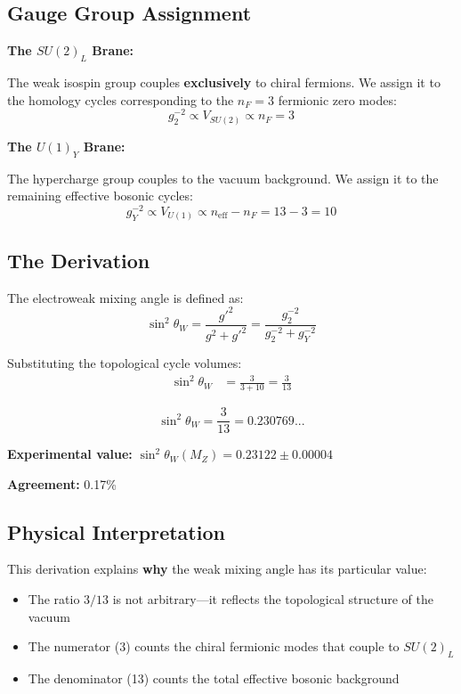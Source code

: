 \documentclass[12pt,a4paper]{article}
\newcommand{\sinW}{\sin^2\theta_W}
\newcommand{\nF}{n_F}
\begin{document}
\subsection{Gauge Group Assignment}

\textbf{The $SU(2)_L$ Brane:}

The weak isospin group couples \textbf{exclusively} to chiral fermions. We assign it to the homology cycles corresponding to the $\nF = 3$ fermionic zero modes:
\begin{equation}
g_2^{-2} \propto V_{SU(2)} \propto \nF = 3
\end{equation}

\textbf{The $U(1)_Y$ Brane:}

The hypercharge group couples to the vacuum background. We assign it to the remaining effective bosonic cycles:
\begin{equation}
g_Y^{-2} \propto V_{U(1)} \propto n_{\text{eff}} - \nF = 13 - 3 = 10
\end{equation}

\subsection{The Derivation}

The electroweak mixing angle is defined as:
\begin{equation}
\sinW = \frac{g'^2}{g^2 + g'^2} = \frac{g_2^{-2}}{g_2^{-2} + g_Y^{-2}}
\end{equation}

Substituting the topological cycle volumes:
\begin{align}
\sinW &= \frac{3}{3 + 10} = \frac{3}{13}
\end{align}

\begin{equation}
\boxed{\sinW = \frac{3}{13} = 0.230769...}
\end{equation}

\textbf{Experimental value:} $\sinW(M_Z) = 0.23122 \pm 0.00004$

\textbf{Agreement:} 0.17\%

\subsection{Physical Interpretation}

This derivation explains \textbf{why} the weak mixing angle has its particular value:
\begin{itemize}
    \item The ratio $3/13$ is not arbitrary---it reflects the topological structure of the vacuum
    \item The numerator (3) counts the chiral fermionic modes that couple to $SU(2)_L$
    \item The denominator (13) counts the total effective bosonic background
\end{itemize}
\end{document}
